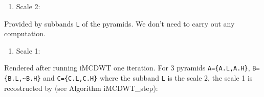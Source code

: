 {\begin{enumerate}
\def\labelenumi{\arabic{enumi}.}
\tightlist
\item
  Scale 2:
\end{enumerate}

Provided by subbands \texttt{L} of the pyramids. We don't need to carry
out any computation.

\begin{enumerate}
\def\labelenumi{\arabic{enumi}.}
\setcounter{enumi}{1}
\tightlist
\item
  Scale 1:
\end{enumerate}

Rendered after running iMCDWT one iteration. For 3 pyramids
\texttt{A=\{A.L,A.H\}}, \texttt{B=\{B.L,\textasciitilde{}B.H\}} and
\texttt{C=\{C.L,C.H\}} where the subband \texttt{L} is the scale 2, the
scale 1 is recostructed by (see Algorithm iMCDWT\_step):

}
